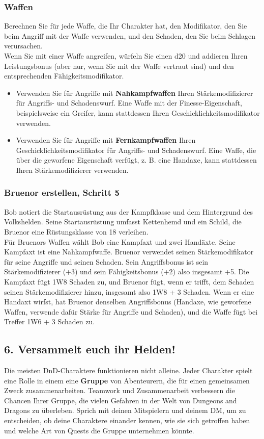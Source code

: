 \subsubsection{Waffen}
Berechnen Sie für jede Waffe, die Ihr Charakter hat, den Modifikator, den Sie beim Angriff mit der Waffe verwenden, und den Schaden, den Sie beim Schlagen verursachen.\\
Wenn Sie mit einer Waffe angreifen, würfeln Sie einen d20 und addieren Ihren Leistungsbonus (aber nur, wenn Sie mit der Waffe vertraut sind) und den entsprechenden Fähigkeitsmodifikator.\\
\begin{itemize}
	\item Verwenden Sie für Angriffe mit \textbf{Nahkampfwaffen} Ihren Stärkemodifizierer für Angriffs- und Schadenswurf. Eine Waffe mit der Finesse-Eigenschaft, beispielsweise ein Greifer, kann stattdessen Ihren Geschicklichkeitsmodifikator verwenden.
	\item Verwenden Sie für Angriffe mit \textbf{Fernkampfwaffen} Ihren Geschicklichkeitsmodifikator für Angriffs- und Schadenswurf. Eine Waffe, die über die geworfene Eigenschaft verfügt, z. B. eine Handaxe, kann stattdessen Ihren Stärkemodifizierer verwenden.
\end{itemize}

\subsubsection{Bruenor erstellen, Schritt 5}
Bob notiert die Startausrüstung aus der Kampfklasse und dem Hintergrund des Volkshelden. Seine Startausrüstung umfasst Kettenhemd und ein Schild, die Bruenor eine Rüstungsklasse von 18 verleihen.\\
Für Bruenors Waffen wählt Bob eine Kampfaxt und zwei Handäxte. Seine Kampfaxt ist eine Nahkampfwaffe. Bruenor verwendet seinen Stärkemodifikator für seine Angriffe und seinen Schaden. Sein Angriffsbonus ist sein Stärkemodifizierer (+3) und sein Fähigkeitsbonus (+2) also insgesamt +5. Die Kampfaxt fügt 1W8 Schaden zu, und Bruenor fügt,  wenn er trifft, dem Schaden seinen Stärkemodifizierer hinzu, insgesamt also 1W8 + 3 Schaden. Wenn er eine Handaxt wirfst, hat Bruenor denselben Angriffsbonus (Handaxe, wie geworfene Waffen, verwende dafür Stärke für Angriffe und Schaden), und die Waffe fügt bei Treffer 1W6 + 3 Schaden zu.\\

\subsection{6. Versammelt euch ihr Helden!}
Die meisten DnD-Charaktere funktionieren nicht alleine. Jeder Charakter spielt eine Rolle in einem eine \textbf{Gruppe} von Abenteurern, die für einen gemeinsamen Zweck zusammenarbeiten. Teamwork und Zusammenarbeit verbessern die Chancen Ihrer Gruppe, die vielen Gefahren in der Welt von Dungeons and Dragons zu überleben. Sprich mit deinen Mitspielern und deinem DM, um zu entscheiden, ob deine Charaktere einander kennen, wie sie sich getroffen haben und welche Art von Quests die Gruppe unternehmen könnte.

